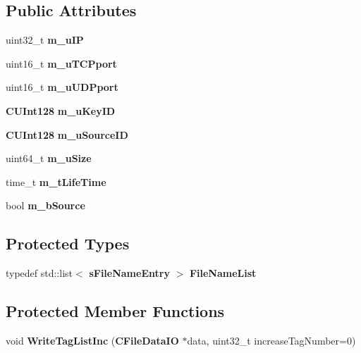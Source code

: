 \subsection*{Public Attributes}
\begin{DoxyCompactItemize}
\item 
uint32\_\-t {\bfseries m\_\-uIP}\label{classKademlia_1_1CEntry_aff4e1fb7f7c038eef24775d07cae2aae}

\item 
uint16\_\-t {\bfseries m\_\-uTCPport}\label{classKademlia_1_1CEntry_ab2741a624e68772d6ee42854ac8e04fc}

\item 
uint16\_\-t {\bfseries m\_\-uUDPport}\label{classKademlia_1_1CEntry_ad0e4d681ed55baf822f79c5a3158996d}

\item 
{\bf CUInt128} {\bfseries m\_\-uKeyID}\label{classKademlia_1_1CEntry_aacd95abbc90647e272b3df9a7e613a7b}

\item 
{\bf CUInt128} {\bfseries m\_\-uSourceID}\label{classKademlia_1_1CEntry_a2802422dae6335c040cb397a5a4fe9e7}

\item 
uint64\_\-t {\bfseries m\_\-uSize}\label{classKademlia_1_1CEntry_a218efce8e69e74fd354995f9296d2eb5}

\item 
time\_\-t {\bfseries m\_\-tLifeTime}\label{classKademlia_1_1CEntry_abe8d25193a6277f8efa8de61e2049159}

\item 
bool {\bfseries m\_\-bSource}\label{classKademlia_1_1CEntry_afd17af5f0bfa43c0ff3465f6b4d25108}

\end{DoxyCompactItemize}
\subsection*{Protected Types}
\begin{DoxyCompactItemize}
\item 
typedef std::list$<$ {\bf sFileNameEntry} $>$ {\bfseries FileNameList}\label{classKademlia_1_1CEntry_a10fa40caf7c64cbd5649397fc6850d34}

\end{DoxyCompactItemize}
\subsection*{Protected Member Functions}
\begin{DoxyCompactItemize}
\item 
void {\bfseries WriteTagListInc} ({\bf CFileDataIO} $\ast$data, uint32\_\-t increaseTagNumber=0)\label{classKademlia_1_1CEntry_a07566d44ec10f72d237cc3954c9777d0}

\end{DoxyCompactItemize}
